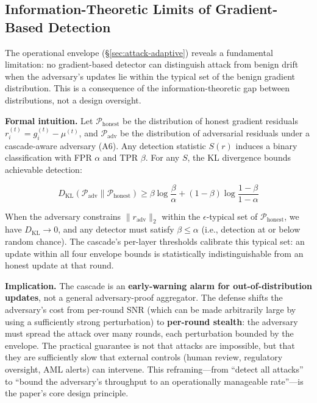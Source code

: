 \documentclass[10pt,journal]{IEEEtran}
\begin{document}
\subsection{Information-Theoretic Limits of Gradient-Based Detection}\label{sec:info-limits}

The operational envelope (\S\ref{sec:attack-adaptive}) reveals a fundamental limitation: no gradient-based detector can distinguish attack from benign drift when the adversary's updates lie within the typical set of the benign gradient distribution. This is a consequence of the information-theoretic gap between distributions, not a design oversight.

\textbf{Formal intuition.} Let $\mathcal{P}_{\text{honest}}$ be the distribution of honest gradient residuals $r_i^{(t)} = g_i^{(t)} - \mu^{(t)}$, and $\mathcal{P}_{\text{adv}}$ be the distribution of adversarial residuals under a cascade-aware adversary (A6). Any detection statistic $S(r)$ induces a binary classification with FPR $\alpha$ and TPR $\beta$. For any $S$, the KL divergence bounds achievable detection:

\begin{equation}
D_{\text{KL}}(\mathcal{P}_{\text{adv}} \| \mathcal{P}_{\text{honest}}) \ge \beta \log\frac{\beta}{\alpha} + (1-\beta) \log\frac{1-\beta}{1-\alpha}
\label{eq:kl-detection-bound}
\end{equation}

When the adversary constrains $\|r_{\text{adv}}\|_2$ within the $\epsilon$-typical set of $\mathcal{P}_{\text{honest}}$, we have $D_{\text{KL}} \to 0$, and any detector must satisfy $\beta \le \alpha$ (i.e., detection at or below random chance). The cascade's per-layer thresholds calibrate this typical set: an update within all four envelope bounds is statistically indistinguishable from an honest update at that round.

\textbf{Implication.} The cascade is an \textbf{early-warning alarm for out-of-distribution updates}, not a general adversary-proof aggregator. The defense shifts the adversary's cost from per-round SNR (which can be made arbitrarily large by using a sufficiently strong perturbation) to \textbf{per-round stealth}: the adversary must spread the attack over many rounds, each perturbation bounded by the envelope. The practical guarantee is not that attacks are impossible, but that they are sufficiently slow that external controls (human review, regulatory oversight, AML alerts) can intervene. This reframing---from ``detect all attacks'' to ``bound the adversary's throughput to an operationally manageable rate''---is the paper's core design principle.
\end{document}
